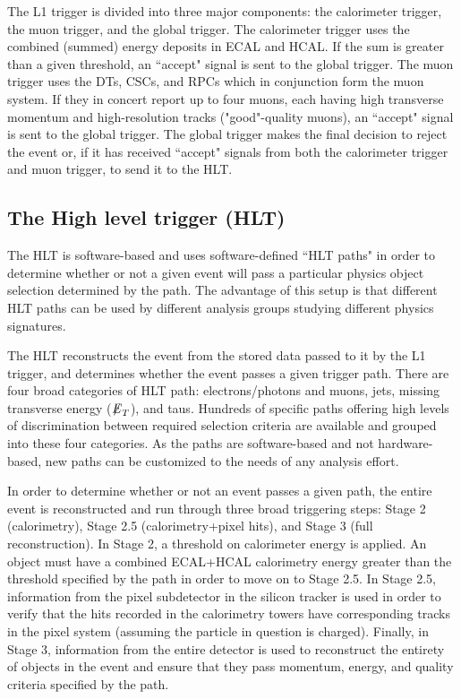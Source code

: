 The L1 trigger is divided into three major components: the calorimeter trigger, the muon trigger, and the global trigger. The calorimeter trigger uses the combined (summed) energy deposits in ECAL and HCAL. If the sum is greater than a given threshold, an ``accept" signal is sent to the global trigger. The muon trigger uses the DTs, CSCs, and RPCs which in conjunction form the muon system. If they in concert report up to four muons, each having high transverse momentum and high-resolution tracks ("good"-quality muons), an ``accept" signal is sent to the global trigger. The global trigger makes the final decision to reject the event or, if it has received ``accept" signals from both the calorimeter trigger and muon trigger, to send it to the HLT.

\subsection{The High level trigger (HLT)}

The HLT is software-based and uses software-defined ``HLT paths" in order to determine whether or not a given event will pass a particular physics object selection determined by the path. The advantage of this setup is that different HLT paths can be used by different analysis groups studying different physics signatures.

The HLT reconstructs the event from the stored data passed to it by the L1 trigger, and determines whether the event passes a given trigger path. There are four broad categories of HLT path: electrons/photons and muons, jets, missing transverse energy (${\not\mathrel{E}}_T$), and taus. Hundreds of specific paths offering high levels of discrimination between required selection criteria are available and grouped into these four categories. As the paths are software-based and not hardware-based, new paths can be customized to the needs of any analysis effort.

In order to determine whether or not an event passes a given path, the entire event is reconstructed and run through three broad triggering steps: Stage 2 (calorimetry), Stage 2.5 (calorimetry+pixel hits), and Stage 3 (full reconstruction). In Stage 2, a threshold on calorimeter energy is applied. An object must have a combined ECAL+HCAL calorimetry energy greater than the threshold specified by the path in order to move on to Stage 2.5. In Stage 2.5, information from the pixel subdetector in the silicon tracker is used in order to verify that the hits recorded in the calorimetry towers have corresponding tracks in the pixel system (assuming the particle in question is charged). Finally, in Stage 3, information from the entire detector is used to reconstruct the entirety of objects in the event and ensure that they pass momentum, energy, and quality criteria specified by the path.\cite{TDR}



